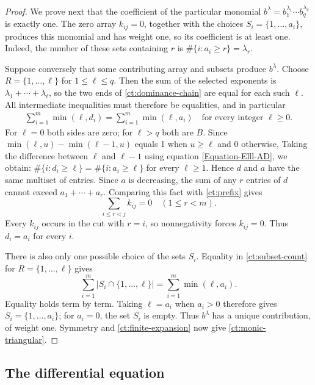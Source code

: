 \documentclass[reqno, 12pt]{article}
\numberwithin{equation}{section}
\theoremstyle{definition}
\begin{document}
\begin{proof}
We prove next that the coefficient of the particular monomial
$b^\lambda=b_1^{\lambda_1}\cdots b_q^{\lambda_q}$ is exactly
one.  The zero array $k_{ij}=0$, together with the choices
$S_i=\{1,\ldots,a_i\}$, produces this monomial and has weight
one, so its coefficient is at least one.  Indeed, the number of
these sets containing $r$ is $\#\{i:a_i\geq r\}=\lambda_r$.

Suppose conversely that some contributing array and subsets
produce $b^\lambda$.  Choose $R=\{1,\ldots,\ell\}$ for
$1\leq \ell\leq q$.  Then the sum of the selected exponents is
$\lambda_1+\cdots+\lambda_\ell$, so the two ends of
\eqref{ct:dominance-chain} are equal for each such $\ell$.
All intermediate inequalities must therefore be equalities, and
in particular
\begin{align}\label{Equation-Elll-AD}
 \sum_{i=1}^m\min(\ell,d_i)=\sum_{i=1}^m\min(\ell,a_i)
 \quad\text{for every integer }\ell\geq0.
\end{align}
For $\ell=0$ both sides are zero; for $\ell>q$ both are $B$.
Since $\min(\ell,u)-\min(\ell-1,u)$ equals 1 when $u\geq \ell$ and 0 otherwise, 
Taking the difference between $\ell$ and $\ell-1$ using equation \eqref{Equation-Elll-AD}, we obtain:
$\#\{i:d_i\geq\ell\}=\#\{i:a_i\geq\ell\}$ for every $\ell\geq1$.
Hence $d$ and $a$ have the same multiset of entries.  Since $a$ is
decreasing, the sum of any $r$ entries of $d$ cannot exceed
$a_1+\cdots+a_r$.  Comparing this fact with
\eqref{ct:prefix} gives
\[
 \sum_{i\leq r<j}k_{ij}=0\quad(1\leq r<m).
\]
Every $k_{ij}$ occurs in the cut with $r=i$, so nonnegativity
forces $k_{ij}=0$.  Thus $d_i=a_i$ for every $i$.

There is also only one possible choice of the sets $S_i$.
Equality in \eqref{ct:subset-count} for
$R=\{1,\ldots,\ell\}$ gives
\[
 \sum_{i=1}^m|S_i\cap\{1,\ldots,\ell\}|
 =\sum_{i=1}^m\min(\ell,a_i).
\]
Equality holds term by term.  Taking $\ell=a_i$ when $a_i>0$
therefore gives $S_i=\{1,\ldots,a_i\}$; for $a_i=0$, the set
$S_i$ is empty.  Thus $b^\lambda$ has a unique contribution,
of weight one.  Symmetry and \cref{ct:finite-expansion}
now give \eqref{ct:monic-triangular}.
\end{proof}

\subsection{The differential equation}
\end{document}
